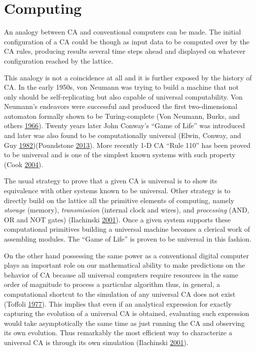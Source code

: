 \documentclass[
  12pt,
  openany]{book}
\begin{document}
\hypertarget{computing}{%
\section{Computing}\label{computing}}

An analogy between CA and conventional computers can be made. The initial configuration of a CA could be though as input data to be computed over by the CA rules, producing results several time steps ahead and displayed on whatever configuration reached by the lattice.

This analogy is not a coincidence at all and it is further exposed by the history of CA. In the early 1950s, von Neumann was trying to build a machine that not only should be self-replicating but also capable of universal computability. Von Neumann's endeavors were successful and produced the first two-dimensional automaton formally shown to be Turing-complete (Von Neumann, Burks, and others \protect\hyperlink{ref-von1966theory}{1966}). Twenty years later John Conway's ``Game of Life'' was introduced and later was also found to be computationally universal (Elwin, Conway, and Guy \protect\hyperlink{ref-elwin1982winning}{1982})(Poundstone \protect\hyperlink{ref-poundstone2013recursive}{2013}). More recently 1-D CA ``Rule 110'' has been proved to be universal and is one of the simplest known systems with such property (Cook \protect\hyperlink{ref-cook2004universality}{2004}).

The usual strategy to prove that a given CA is universal is to show its equivalence with other systems known to be universal. Other strategy is to directly build on the lattice all the primitive elements of computing, namely \emph{storage} (memory), \emph{transmission} (internal clock and wires), and \emph{processing} (AND, OR and NOT gates) (Ilachinski \protect\hyperlink{ref-ilachinski2001cellular}{2001}). Once a given system supports these computational primitives building a universal machine becomes a clerical work of assembling modules. The ``Game of Life'' is proven to be universal in this fashion.

On the other hand possessing the same power as a conventional digital computer plays an important role on our mathematical ability to make predictions on the behavior of CA because all universal computers require resources in the same order of magnitude to process a particular algorithm thus, in general, a computational shortcut to the simulation of any universal CA does not exist (Toffoli \protect\hyperlink{ref-toffoli1977cellular}{1977}). This implies that even if an analytical expression for exactly capturing the evolution of a universal CA is obtained, evaluating such expression would take asymptotically the same time as just running the CA and observing its own evolution. Thus remarkably the most efficient way to characterize a universal CA is through its own simulation (Ilachinski \protect\hyperlink{ref-ilachinski2001cellular}{2001}).
\end{document}
